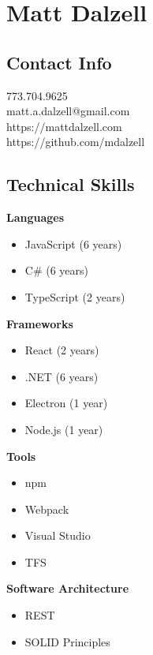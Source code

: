 \documentclass[12pt]{article}
\begin{document}

\section*{Matt Dalzell}

\setlength{\columnsep}{4em}
\setlength{\columnseprule}{0.1pt}
\begin{paracol}{2}

\subsection*{Contact Info}
773.704.9625 \\
matt.a.dalzell@gmail.com \\ 
https://mattdalzell.com \\
https://github.com/mdalzell

\subsection*{Technical Skills} 

\textbf{Languages}
\begin{itemize}
    \item JavaScript {\footnotesize{(6 years)}}
    \item C\# {\footnotesize{(6 years)}}
    \item TypeScript {\footnotesize{(2 years)}}
\end{itemize} 

\noindent \textbf{Frameworks}
\begin{itemize}
    \item React {\footnotesize{(2 years)}}
    \item .NET {\footnotesize{(6 years)}}
    \item Electron {\footnotesize{(1 year)}}
    \item Node.js {\footnotesize{(1 year)}}
\end{itemize}

\noindent \textbf{Tools}
\begin{itemize}
    \item npm
    \item Webpack
    \item Visual Studio
    \item TFS
\end{itemize}

\noindent \textbf{Software Architecture}
\begin{itemize}
    \item REST
    \item SOLID Principles
\end{itemize}


\end{paracol}
\end{document}
